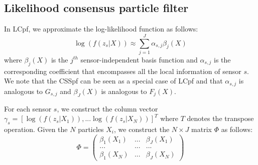 \documentclass[10pt,letterpaper,final]{article}
\begin{document}
\subsection{Likelihood consensus particle filter}
In LCpf, we approximate the log-likelihood function as follows:
\begin{equation}
\log(f(z_s|X)) \approx \sum_{j=1}^J \alpha_{s,j} \beta_j(X)
\label{eqn:Hx_LC}
\end{equation}
where $\beta_j(X)$ is the $j^{th}$ sensor-independent basis function and $\alpha_{s,j}$ is the corresponding coefficient that encompasses all the local information of sensor $s$. We note that the CSSpf can be seen as a special case of LCpf and that $\alpha_{s,j}$ is analogous to $G_{s,j}$ and $\beta_J(X)$ is analogous to $F_j(X)$.  

%


For each sensor $s$, we construct the column vector $\gamma_s = [ \log(f(z_s|X_1)), ... \log(f(z_s|X_N))  ]^T$ where $T$ denotes the transpose operation. Given the $N$ particles $X_i$, we construct the $N\times J$ matrix $\Phi$ as follows:
\begin{equation}
\Phi=\left(
\begin{array}{ccc}
\beta_1(X_1) & ... & \beta_J(X_1) \\
... & ... & ... \\
\beta_1(X_N) & ... & \beta_J(X_N)
\end{array}
\right)
\label{eqn:beta_matrix}
\end{equation}
\end{document}
